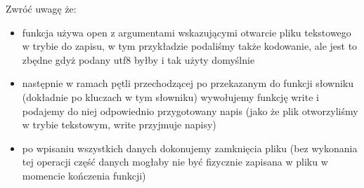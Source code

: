 \noindent Zwróć uwagę że:
\begin{itemize}
\item funkcja używa open z argumentami wskazującymi otwarcie pliku tekstowego w trybie do zapisu, w tym przykładzie podaliśmy także kodowanie, ale jest to zbędne gdyż podany utf8 byłby i tak użyty domyślnie
\item następnie w ramach pętli przechodzącej po przekazanym do funkcji słowniku (dokładnie po kluczach w tym słowniku) wywołujemy funkcję write i podajemy do niej odpowiednio przygotowany napis (jako że plik otworzyliśmy w trybie tekstowym, write przyjmuje napisy)
\item po wpisaniu wszystkich danych dokonujemy zamknięcia pliku (bez wykonania tej operacji część danych mogłaby nie być fizycznie zapisana w pliku w momencie kończenia funkcji)
\end{itemize}
\fi
